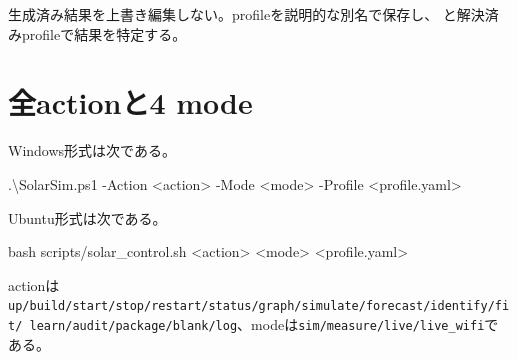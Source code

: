 \documentclass[
  japanese,
  a4paper,
]{article}
\newenvironment{Shaded}{}{}
\newcommand{\FunctionTok}[1]{\textcolor[rgb]{0.02,0.16,0.49}{#1}}
\newcommand{\NormalTok}[1]{#1}
\newcommand{\OperatorTok}[1]{\textcolor[rgb]{0.40,0.40,0.40}{#1}}
\begin{document}
生成済み結果を上書き編集しない。profileを説明的な別名で保存し、
と解決済みprofileで結果を特定する。

\section{全actionと4 mode}\label{ux5168actionux30684-mode}

Windows形式は次である。

\begin{Shaded}
\begin{Highlighting}[]
\OperatorTok{.}\NormalTok{\textbackslash{}SolarSim}\OperatorTok{.}\FunctionTok{ps1} \OperatorTok{{-}}\NormalTok{Action }\OperatorTok{\textless{}}\NormalTok{action}\OperatorTok{\textgreater{}} \OperatorTok{{-}}\NormalTok{Mode }\OperatorTok{\textless{}}\NormalTok{mode}\OperatorTok{\textgreater{}} \OperatorTok{{-}}\NormalTok{Profile }\OperatorTok{\textless{}}\NormalTok{profile}\OperatorTok{.}\FunctionTok{yaml}\OperatorTok{\textgreater{}}
\end{Highlighting}
\end{Shaded}

Ubuntu形式は次である。

\begin{Shaded}
\begin{Highlighting}[]
\FunctionTok{bash}\NormalTok{ scripts/solar\_control.sh }\OperatorTok{\textless{}}\NormalTok{action}\OperatorTok{\textgreater{}} \OperatorTok{\textless{}}\NormalTok{mode}\OperatorTok{\textgreater{}} \OperatorTok{\textless{}}\NormalTok{profile.yaml}\OperatorTok{\textgreater{}}
\end{Highlighting}
\end{Shaded}

actionは\texttt{up/build/start/stop/restart/status/graph/simulate/forecast/identify/fit/\ learn/audit/package/blank/log}、modeは\texttt{sim/measure/live/live\_wifi}である。
\end{document}
